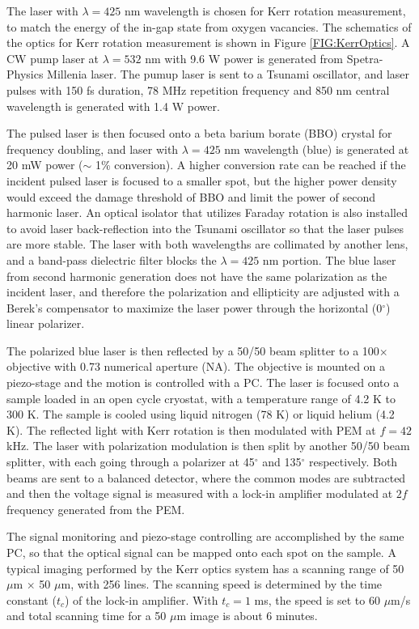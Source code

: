 \documentclass[pdflatex, sectionletters, 12pt]{pittetd}    %
\begin{document}
The laser with $\lambda = 425$ nm wavelength is chosen for Kerr rotation measurement, to match the energy of the in-gap state from oxygen vacancies\cite{rice2014persistent}. The schematics of the optics for Kerr rotation measurement is shown in Figure \ref{FIG:KerrOptics}. A CW pump laser at $\lambda=532$ nm with 9.6 W power is generated from Spetra-Physics Millenia laser. The pumup laser is sent to a Tsunami oscillator, and laser pulses with 150 fs duration, 78 MHz repetition frequency and 850 nm central wavelength is generated with 1.4 W power. 

The pulsed laser is then focused onto a beta barium borate (BBO) crystal for frequency doubling, and laser with $\lambda=425$ nm wavelength (blue) is generated at 20 mW power ($\sim$ 1\% conversion). A higher conversion rate can be reached if the incident pulsed laser is focused to a smaller spot, but the higher power density would exceed the damage threshold of BBO and limit the power of second harmonic laser. An optical isolator that utilizes Faraday rotation is also installed to avoid laser back-reflection into the Tsunami oscillator so that the laser pulses are more stable. The laser with both wavelengths are collimated by another lens, and a band-pass dielectric filter blocks the $\lambda=425$ nm portion. The blue laser from second harmonic generation does not have the same polarization as the incident laser, and therefore the polarization and ellipticity are adjusted with a Berek's compensator to maximize the laser power through the horizontal (0$^{\circ}$) linear polarizer. 

The polarized blue laser is then reflected by a 50/50 beam splitter to a 100$\times$ objective with 0.73 numerical aperture (NA). The objective is mounted on a piezo-stage and the motion is controlled with a PC. The laser is focused onto a sample loaded in an open cycle cryostat, with a temperature range of 4.2 K to 300 K. The sample is cooled using liquid nitrogen (78 K) or liquid helium (4.2 K). The reflected light with Kerr rotation is then modulated with PEM at $f = 42$ kHz. The laser with polarization modulation is then split by another 50/50 beam splitter, with each going through a polarizer at 45$^{\circ}$ and 135$^{\circ}$ respectively. Both beams are sent to a balanced detector, where the common modes are subtracted and then the voltage signal is measured with a lock-in amplifier modulated at $2f$ frequency generated from the PEM. 

The signal monitoring and piezo-stage controlling are accomplished by the same PC, so that the optical signal can be mapped onto each spot on the sample. A typical imaging performed by the Kerr optics system has a scanning range of 50 $\mu$m $\times$ 50 $\mu$m, with 256 lines. The scanning speed is determined by the time constant ($t_c$) of the lock-in amplifier. With $t_c = 1$ ms, the speed is set to 60 $\mu$m/s and total scanning time for a 50 $\mu$m image is about 6 minutes.
\end{document}
